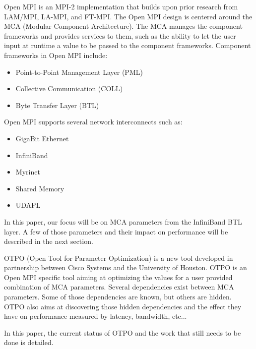 Open MPI\cite{gabriel:ompi} is an MPI-2\cite{mpi1} implementation that
builds upon prior research from LAM/MPI\cite{lammpi}, LA-MPI\cite{la-mpi},
and FT-MPI\cite{ftmpi}. The Open MPI design is centered around the MCA
(Modular Component Architecture). The MCA manages the component frameworks and
provides services to them, such as the ability to let the user input at
runtime a value to be passed to the component frameworks. Component frameworks
in Open MPI include:
\begin{itemize}
\item Point-to-Point Management Layer (PML)
\item Collective Communication (COLL)
\item Byte Transfer Layer (BTL)
\end{itemize}

Open MPI supports several network interconnects such as:
\begin{itemize}
\item GigaBit Ethernet
\item InfiniBand\cite{ib}
\item Myrinet
\item Shared Memory
\item UDAPL
\end{itemize}

In this paper, our focus will be on MCA parameters from the InfiniBand BTL
layer. A few of those parameters and their impact on performance will be
described in the next section.

OTPO (Open Tool for Parameter Optimization) is a new tool developed in
partnership between Cisco Systems and the University of Houston. OTPO is an
Open MPI specific tool aiming at optimizing the values for a user
provided combination of MCA parameters. Several dependencies exist between MCA
parameters. Some of those dependencies are known, but others are hidden. OTPO
also aims at discovering those hidden dependencies and the effect they have on
performance measured by latency, bandwidth, etc...

In this paper, the current status of OTPO and the work that still needs
to be done is detailed.
